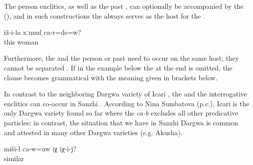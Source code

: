 The person enclitics, as well as the past , can optionally be accompanied by the  (), and in such constructions the  always serves as the host for the  . 


\begin{exe}
	\ex	\label{ex:‎‎‎Are you his wife}
	\gll	iž-i-la	xːunul	ca-r=de=w?\\
		this	woman	\\
	\glt	{}
\end{exe}

Furthermore, the  and the person  or past  need to occur on the same host; they cannot be separated . If in the example below the  at the end is omitted, the clause becomes grammatical with the meaning given in brackets below. 

\begin{exe}
\end{exe}

In contrast to the neighboring Dargwa variety of Icari \citep[138]{Sumbatova.Mutalov2003}, the  and the interrogative enclitics can co-occur in Sanzhi . According to Nina Sumbatova (p.c.), Icari is the only Dargwa variety found so far where the  \textit{ca-b} excludes all other predicative particles; in contrast, the situation that we have in Sanzhi Dargwa is common and attested in many other Dargwa varieties (e.g. Akusha). 

\begin{exe}
	\ex	\label{ex:Is this similar to himSyntax}
	\gll	miši-l	ca-w=uw	iχ	iχ-i-j?\\
		similar		\tsc{dem.down}	\\
	\glt	{}
\end{exe}

